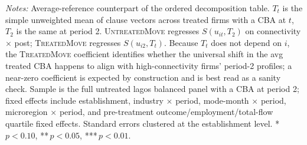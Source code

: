 \begin{table}[H]
\begin{minipage}{\linewidth}
\scriptsize\textit{Notes:} Average-reference counterpart of the ordered decomposition table. $T_t$ is the simple unweighted mean of clause vectors across treated firms with a CBA at $t$, $T_2$ is the same at period 2. \textsc{UntreatedMove} regresses $S(u_{it}, T_2)$ on connectivity $\times$ post; \textsc{TreatedMove} regresses $S(u_{i2}, T_t)$. Because $T_t$ does not depend on $i$, the \textsc{TreatedMove} coefficient identifies whether the universal shift in the avg treated CBA happens to align with high-connectivity firms' period-2 profiles; a near-zero coefficient is expected by construction and is best read as a sanity check. Sample is the full untreated lagos balanced panel with a CBA at period 2; fixed effects include establishment, industry $\times$ period, mode-month $\times$ period, microregion $\times$ period, and pre-treatment outcome/employment/total-flow quartile fixed effects. Standard errors clustered at the establishment level. *\,$p<0.10$, **\,$p<0.05$, ***\,$p<0.01$.
\end{minipage}
\end{table}

